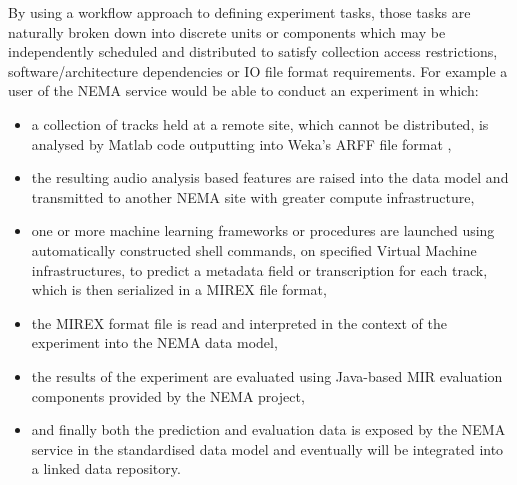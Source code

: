 \documentclass[conference]{IEEEtran}
\begin{document}
By using a workflow approach to defining experiment tasks, those tasks are naturally broken down into discrete units or components which may be independently scheduled and distributed to satisfy collection access restrictions, software/architecture dependencies or IO file format requirements. For example a user of the NEMA service would be able to conduct an experiment in which:
\begin{itemize}
\item a collection of tracks held at a remote site, which cannot be distributed, is analysed by Matlab code outputting into Weka's ARFF file format \cite{witten1999wpm}, 
\item the resulting audio analysis based features are raised into the data model and transmitted to another NEMA site with greater compute infrastructure, 
\item one or more machine learning frameworks or procedures are launched using automatically constructed shell commands, on specified Virtual Machine infrastructures, to predict a metadata field or transcription for each track, which is then serialized in a MIREX file format,
\item the MIREX format file is read and interpreted in the context of the experiment into the NEMA data model,
\item the results of the experiment are evaluated using Java-based MIR evaluation components provided by the NEMA project,
\item and finally both the prediction and evaluation data is exposed by the NEMA service in the standardised data model and eventually will be integrated into a linked data repository.
\end{itemize}
\end{document}
